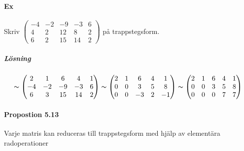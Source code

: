 \paragraph{Ex} Skriv 
$\begin{pmatrix}
    -4&-2&-9&-3&6\\
    4&2&12&8&2\\
    6&2&15&14&2
\end{pmatrix}$
på trappstegsform.
\subparagraph{Lösning}
\begin{equation*}\thicksim
    \begin{pmatrix}
        2&1&6&4&1\\
        -4&-2&-9&-3&6\\
        6&3&15&14&2
    \end{pmatrix}
    \thicksim
    \begin{pmatrix}
        2&1&6&4&1\\
        0&0&3&5&8\\
        0&0&-3&2&-1
    \end{pmatrix}
    \thicksim
    \begin{pmatrix}
        2&1&6&4&1\\
        0&0&3&5&8\\
        0&0&0&7&7
    \end{pmatrix}
\end{equation*}

\paragraph{Propostion 5.13} Varje matris kan reduceras till trappstegsform med hjälp av elementära radoperationer

